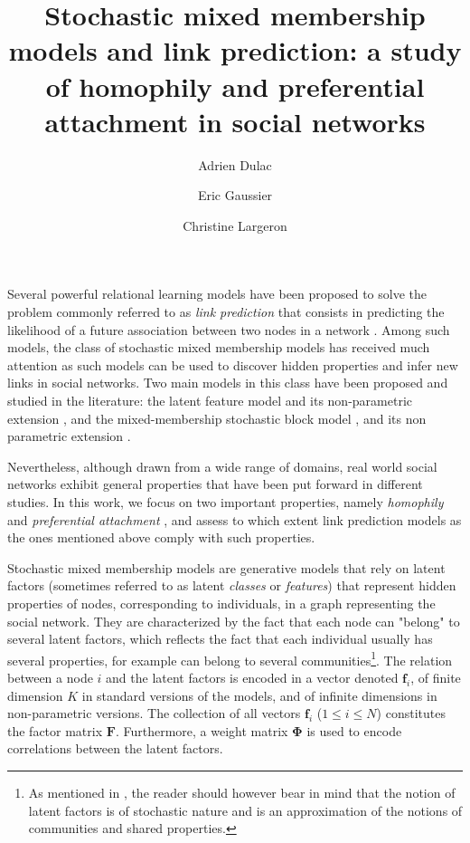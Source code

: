 \documentclass[9pt,twocolumn,twoside]{pnas-new}
\title{Stochastic mixed membership models and link prediction: a study of homophily and preferential attachment in social networks}
\author[a,b]{Adrien Dulac}
\author[a]{Eric Gaussier}
\author[b,1]{Christine Largeron}
\affil[a]{Univ. Grenoble Alpes, CNRS, Grenoble INP, LIG - F-38000 Grenoble}
\affil[b]{Universit\'e Jean Monnet, Laboratoire Hubert Curien - F-42000 Saint-Etienne}
\newcommand{\mat}[1]{\mathbf{#1}}
\begin{document}
\verticaladjustment{-2pt}

\maketitle
\thispagestyle{firststyle}

Several powerful relational learning models have been proposed to solve the problem commonly referred to as \textit{link prediction} that consists in predicting the likelihood of a future association between two nodes in a network \cite{Liben-Nowell07, HassanZaki11}. Among such models, the class of stochastic mixed membership models has received much attention as such models can be used to discover hidden properties and infer new links in social networks. Two main models in this class have been proposed and studied in the literature: the latent feature model \cite{BMF} and its non-parametric extension \cite{ILFRM}, and the mixed-membership stochastic block model \cite{MMSB}, and its non parametric extension \cite{iMMSB,diMMSB}.

Nevertheless, although drawn from a wide range of domains, real world social networks exhibit general properties that have been put forward in different studies. In this work, we focus on two important properties, namely \textit{homophily} and \textit{preferential attachment} \cite{Newman2010, Barabasi2003}, and assess to which extent link prediction models as the ones mentioned above comply with such properties.

Stochastic mixed membership models are generative models that rely on latent factors (sometimes referred to as latent \textit{classes} or \textit{features}) that represent hidden properties of nodes, corresponding to individuals, in a graph representing the social network. They are characterized by the fact that each node can "belong" to several latent factors, which reflects the fact that each individual usually has several properties, for example can belong to several communities\footnote{As mentioned in \cite{goldenberg2010survey}, the reader should however bear in mind that the notion of latent factors is of stochastic nature and is an approximation of the notions of communities and shared properties.}. The relation between a node $i$ and the latent factors is encoded in a vector denoted $\mat{f}_{i}$, of finite dimension $K$ in standard versions of the models, and of infinite dimensions in  non-parametric versions. The collection of all vectors $\mat{f}_{i}$ ($1 \le i \le N$) constitutes the factor matrix $\mat{F}$. Furthermore, a weight matrix $\mat{\Phi}$ is used to encode correlations between the latent factors.
\end{document}
